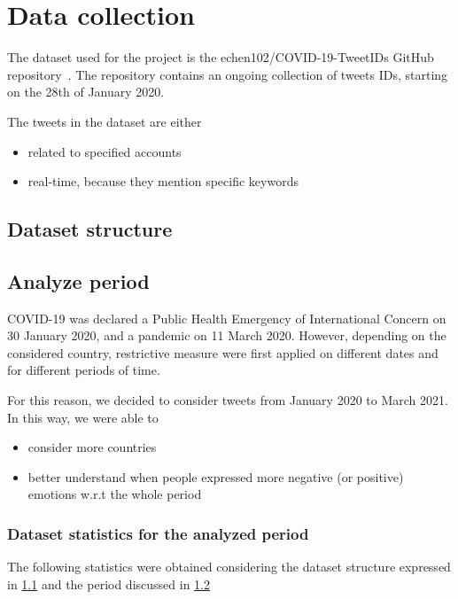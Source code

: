 \chapter{Data collection}
\label{cha:data}
The dataset used for the project is the echen102/COVID-19-TweetIDs GitHub repository~\cite{chen2020tracking}. The repository contains an ongoing collection of tweets IDs, starting on the 28th of January 2020.

The tweets in the dataset are either
\begin{itemize}
	\item related to specified accounts
	\item real-time, because they mention specific keywords
\end{itemize}

\section{Dataset structure}
\label{sec:dataset_struct}


\section{Analyze period}
\label{sec:period}
COVID-19 was declared a Public Health Emergency of International Concern on 30 January 2020, and a pandemic on 11 March 2020. However, depending on the considered country, restrictive measure were first applied on different dates and for different periods of time. 

For this reason, we decided to consider tweets from January 2020 to March 2021. In this way, we were able to

\begin{itemize}
	\item consider more countries
	\item better understand when people expressed more negative (or positive) emotions w.r.t the whole period
\end{itemize}

\subsection{Dataset statistics for the analyzed period}
\label{subsec:dataset_stats}

The following statistics were obtained considering the dataset structure expressed in \cref{sec:dataset_struct} and the period discussed in \cref{sec:period}

